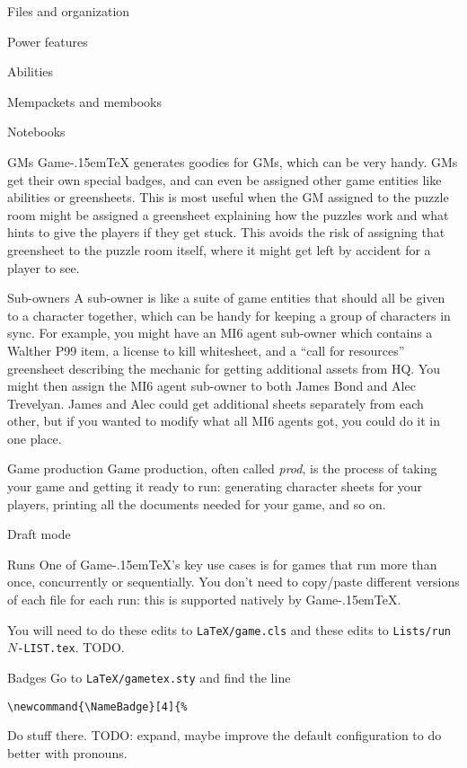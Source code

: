 \documentclass[11pt]{article}
\def\gametex{\mbox{Game\kern-.15em\TeX}}
\begin{document}
\begin{section}{Files and organization}
\begin{subsection}{Power features}
\begin{subsubsection}{Abilities}
\end{subsubsection}
\begin{subsubsection}{Mempackets and membooks}\label{mems}
\end{subsubsection}
\begin{subsection}{Notebooks}
\end{subsection}
\begin{subsubsection}{GMs}
\gametex{} generates goodies for GMs, which can be very handy.  GMs get their own special badges, and can even be assigned other game entities like abilities or greensheets.  This is most useful when the GM assigned to the puzzle room might be assigned a greensheet explaining how the puzzles work and what hints to give the players if they get stuck.  This avoids the risk of assigning that greensheet to the puzzle room itself, where it might get left by accident for a player to see.
\end{subsubsection}
\begin{subsubsection}{Sub-owners}
A sub-owner is like a suite of game entities that should all be given to a character together, which can be handy for keeping a group of characters in sync.  For example, you might have an MI6 agent sub-owner which contains a Walther P99 item, a license to kill whitesheet, and a ``call for resources'' greensheet describing the mechanic for getting additional assets from HQ.  You might then assign the MI6 agent sub-owner to both James Bond and Alec Trevelyan.  James and Alec could get additional sheets separately from each other, but if you wanted to modify what all MI6 agents got, you could do it in one place.
\end{subsubsection}
\end{subsection}
\end{section}
\begin{section}{Game production}
Game production, often called \emph{prod}, is the process of taking your game and getting it ready to run: generating character sheets for your players, printing all the documents needed for your game, and so on.

\begin{subsection}{Draft mode}
\label{draft}
\end{subsection}
\begin{subsection}{Runs}
One of \gametex{}'s key use cases is for games that run more than once, concurrently or sequentially.  You don't need to copy/paste different versions of each file for each run: this is supported natively by \gametex{}.

You will need to do these edits to \lstinline|LaTeX/game.cls| and these edits to \texttt{Lists/run$N$-LIST.tex}.  TODO.
\end{subsection}
\begin{subsection}{Badges}
\label{badges}
Go to \lstinline{LaTeX/gametex.sty} and find the line 
\begin{verbatim}
\newcommand{\NameBadge}[4]{%
\end{verbatim}
Do stuff there.  TODO: expand, maybe improve the default configuration to do better with pronouns.
\end{subsection}
\end{section}
\end{document}
